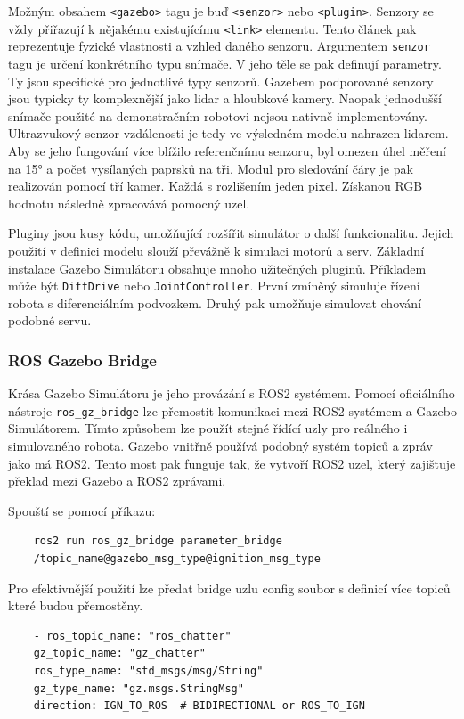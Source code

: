 Možným obsahem \verb|<gazebo>| tagu je buď \verb|<senzor>| nebo \verb|<plugin>|. Senzory se vždy přiřazují k nějakému existujícímu \verb|<link>| elementu. Tento článek pak reprezentuje fyzické vlastnosti a vzhled daného senzoru. Argumentem \verb|senzor| tagu je určení konkrétního typu snímače. V jeho těle se pak definují parametry. Ty jsou specifické pro jednotlivé typy senzorů. Gazebem podporované senzory jsou typicky ty komplexnější jako lidar a hloubkové kamery. Naopak jednodušší snímače použité na demonstračním robotovi nejsou nativně implementovány. Ultrazvukový senzor vzdálenosti je tedy ve výsledném modelu nahrazen lidarem. Aby se jeho fungování více blížilo referenčnímu senzoru, byl omezen úhel měření na 15° a počet vysílaných paprsků na tři. Modul pro sledování čáry je pak realizován pomocí tří kamer. Každá s rozlišením jeden pixel. Získanou RGB hodnotu následně zpracovává pomocný uzel.

Pluginy jsou kusy kódu, umožňující rozšířit simulátor o další funkcionalitu. Jejich použití v definici modelu slouží převážně k simulaci motorů a serv. Základní instalace Gazebo Simulátoru obsahuje mnoho užitečných pluginů. Příkladem může být \verb|DiffDrive| nebo \verb|JointController|. První zmíněný simuluje řízení robota s diferenciálním podvozkem. Druhý pak umožňuje simulovat chování podobné servu. 

\subsubsection*{ROS Gazebo Bridge}
Krása Gazebo Simulátoru je jeho provázání s ROS2 systémem. Pomocí oficiálního nástroje \verb|ros_gz_bridge| lze přemostit komunikaci mezi ROS2 systémem a Gazebo Simulátorem. Tímto způsobem lze použít stejné řídící uzly pro reálného i simulovaného robota. Gazebo vnitřně používá podobný systém topiců a zpráv jako má ROS2. Tento most pak funguje tak, že vytvoří ROS2 uzel, který zajištuje překlad mezi Gazebo a ROS2 zprávami.

Spouští se pomocí příkazu:
\begin{verbatim}
	ros2 run ros_gz_bridge parameter_bridge 
	/topic_name@gazebo_msg_type@ignition_msg_type
\end{verbatim}
Pro efektivnější použití lze předat bridge uzlu config soubor s definicí více topiců které budou přemostěny.
\begin{verbatim}
	- ros_topic_name: "ros_chatter"
	gz_topic_name: "gz_chatter"
	ros_type_name: "std_msgs/msg/String"
	gz_type_name: "gz.msgs.StringMsg"
	direction: IGN_TO_ROS  # BIDIRECTIONAL or ROS_TO_IGN
\end{verbatim}

